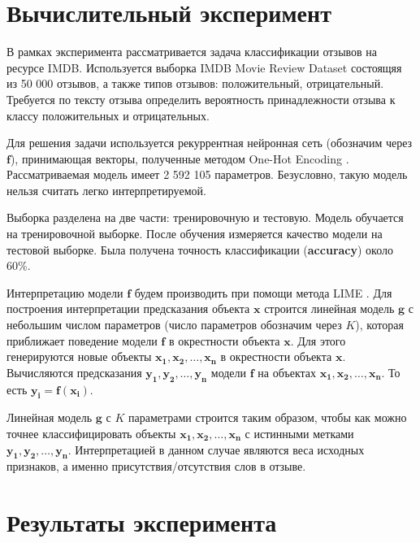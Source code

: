 \documentclass[12pt]{article}
\begin{document}

\section{Вычислительный эксперимент}

В рамках эксперимента рассматривается задача классификации отзывов на ресурсе IMDB. Используется выборка IMDB Movie Review Dataset \cite{maas-EtAl:2011:ACL-HLT2011} состоящяя из 50 000 отзывов, а также типов отзывов: положительный, отрицательный. Требуется по тексту отзыва определить вероятность принадлежности отзыва к классу положительных и отрицательных.

Для решения задачи используется рекуррентная нейронная сеть (обозначим через $\mathbf{f}$), принимающая векторы, полученные методом One-Hot Encoding \cite{onehot2018}. Рассматриваемая модель имеет 2 592 105 параметров. Безусловно, такую модель нельзя считать легко интерпретируемой.

Выборка разделена на две части: тренировочную и тестовую. Модель обучается на тренировочной выборке. После обучения измеряется качество модели на тестовой выборке. Была получена точность классификации (\textbf{accuracy}) около 60\%.

Интерпретацию модели $\mathbf{f}$ будем производить при помощи метода LIME \cite{ribeiro2016why}. Для построения интерпретации предсказания объекта $\mathbf{x}$ строится линейная модель $\mathbf{g}$ с небольшим числом параметров (число параметров обозначим через $K$), которая приближает поведение модели $\mathbf{f}$ в окрестности объекта $\mathbf{x}$. Для этого генерируются новые объекты $\mathbf{x_1}, \mathbf{x_2}, \dots, \mathbf{x_n}$ в окрестности объекта $\mathbf{x}$. Вычисляются предсказания $\mathbf{y_1}, \mathbf{y_2}, \dots, \mathbf{y_n}$ модели $\mathbf{f}$ на объектах $\mathbf{x_1}, \mathbf{x_2}, \dots, \mathbf{x_n}$. То есть $\mathbf{y_i}=\mathbf{f}(\mathbf{x_i})$.

Линейная модель $\mathbf{g}$ с $K$ параметрами строится таким образом, чтобы как можно точнее классифицировать объекты $\mathbf{x_1}, \mathbf{x_2}, \dots, \mathbf{x_n}$ с истинными метками $\mathbf{y_1}, \mathbf{y_2}, \dots, \mathbf{y_n}$. Интерпретацией в данном случае являются веса исходных признаков, а именно присутствия/отсутствия слов в отзыве.

\section{Результаты эксперимента}
\end{document}
